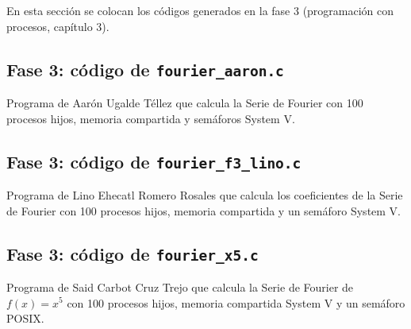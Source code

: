 En esta sección se colocan los códigos generados en la fase 3 (programación con procesos, capítulo 3).

\subsection{Fase 3: código de \texttt{fourier\_aaron.c}}
\label{sec:cap03:anexo:c}

Programa de Aarón Ugalde Téllez que calcula la Serie de Fourier con 100 procesos hijos, memoria compartida y semáforos System V.



\subsection{Fase 3: código de \texttt{fourier\_f3\_lino.c}}
\label{sec:cap03:anexo:lino}

Programa de Lino Ehecatl Romero Rosales que calcula los coeficientes de la Serie de Fourier con 100 procesos hijos, memoria compartida y un semáforo System V.




\subsection{Fase 3: código de \texttt{fourier\_x5.c}}
\label{sec:cap03:anexo:said}

Programa de Said Carbot Cruz Trejo que calcula la Serie de Fourier de $f(x) = x^{5}$ con 100 procesos hijos, memoria compartida System V y un semáforo POSIX.


